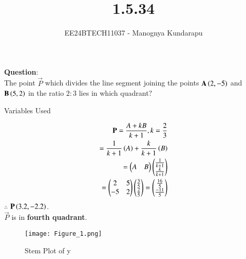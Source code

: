 \documentclass[journal]{IEEEtran}
\begin{document}

\vspace{3cm}

\title{1.5.34}
\author{EE24BTECH11037 - Manognya Kundarapu
}
{\let\newpage\relax\maketitle}

\renewcommand{\thefigure}{\theenumi}
\renewcommand{\thetable}{\theenumi}
\setlength{\intextsep}{10pt} %


\renewcommand{\thetable}{\theenumi}


\textbf{Question}:\\
The point $\vec P$ which divides the line segment joining the points $\mathbf A\left(2,-5\right)$ and $\mathbf B\left(5,2\right)$ in the ratio $2 \colon 3$ lies in which quadrant$?$
\\
\solution
\begin{table}[ht!]    
  \centering
  
  \caption{Variables Used}
  \label{tab10.5.3.9.1}
\end{table}
\begin{align}
\vec P=\frac{A+kB}{k+1}, k=\frac{2}{3}\\
    =\frac{1}{k+1}\brak{A}+\frac{k}{k+1}\brak{B}\\
    =%
\begin{pmatrix}
A & B \\
\end{pmatrix}
\begin{pmatrix}
\frac{1}{k+1} \\
\frac{k}{k+1}\\
\end{pmatrix}\\
    =%
\begin{pmatrix}
2 & 5\\
-5 & 2\\
\end{pmatrix}
\begin{pmatrix}
\frac{3}{5}\\
\frac{2}{5}\\
\end{pmatrix}
=%
\begin{pmatrix}
\frac{16}{5}\\
\frac{-11}{5}\\
\end{pmatrix}
\end{align}
$\therefore$ $\mathbf P\left(3.2, -2.2\right)$. \\ 
$\vec P$ is in \textbf{fourth quadrant}.
\begin{figure}[h!]
   \centering
   \texttt{[image: Figure\_1.png]}
   \caption{Stem Plot of y}
   \label{stemplot}
\end{figure}
\end{document}
